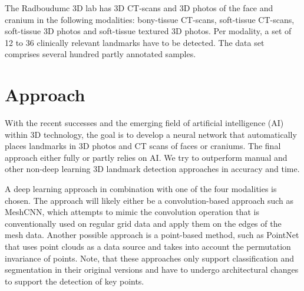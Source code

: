 \documentclass{article}
\begin{document}
The Radboudumc 3D lab has 3D CT-scans and 3D photos of the face and cranium in the following modalities: bony-tissue CT-scans, soft-tissue CT-scans, soft-tissue 3D photos and soft-tissue textured 3D photos. Per modality, a set of 12 to 36 clinically relevant landmarks have to be detected. The data set comprises several hundred partly annotated samples.



\section{Approach}
With the recent successes and the emerging field of artificial intelligence (AI) within 3D technology, the goal is to develop a neural network that automatically places landmarks in 3D photos and CT scans of faces or craniums. The final approach either fully or partly relies on AI. We try to outperform manual and other non-deep learning 3D landmark detection approaches in accuracy and time.

A deep learning approach in combination with one of the four modalities is chosen. The approach will likely either be a convolution-based approach such as MeshCNN, which attempts to mimic the convolution operation that is conventionally used on regular grid data and apply them on the edges of the mesh data. Another possible approach is a point-based method, such as PointNet \cite{Qi2017} that uses point clouds as a data source and takes into account the permutation invariance of points. Note, that these approaches only support classification and segmentation in their original versions and have to undergo architectural changes to support the detection of key points.
\end{document}
